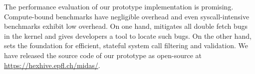 The performance evaluation of our prototype implementation is promising.
Compute-bound benchmarks have negligible overhead and even syscall-intensive
benchmarks exhibit low overhead. On one hand, \midas mitigates all double fetch
bugs in the kernel and gives developers a tool to locate such bugs. On the other
hand, \midas sets the foundation for efficient, stateful system call filtering
and validation.
%
We have released the source code of our prototype as open-source at
\url{https://hexhive.epfl.ch/midas/}.